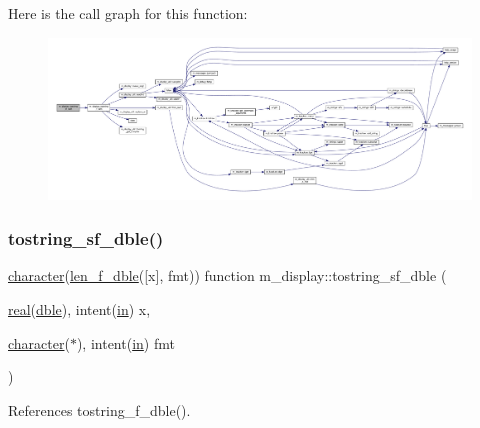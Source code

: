 Here is the call graph for this function\+:
\nopagebreak
\begin{figure}[H]
\begin{center}
\leavevmode
\includegraphics[width=350pt]{namespacem__display_a2a7022ce15edf03ceccb423e9da40c87_cgraph}
\end{center}
\end{figure}
\mbox{\label{namespacem__display_a41a473fe1569b4f3b44cc3f9b1f5b1ce}} 
\subsubsection{\texorpdfstring{tostring\+\_\+sf\+\_\+dble()}{tostring\_sf\_dble()}}
{\footnotesize\ttfamily \hyperlink{option__stopwatch_83_8txt_abd4b21fbbd175834027b5224bfe97e66}{character}(\hyperlink{namespacem__display_aa013a639d5b0f7e40b627c9d712693f0}{len\+\_\+f\+\_\+dble}(\mbox{[}x\mbox{]}, fmt)) function m\+\_\+display\+::tostring\+\_\+sf\+\_\+dble (\begin{DoxyParamCaption}\item[{\hyperlink{read__watch_83_8txt_abdb62bde002f38ef75f810d3a905a823}{real}(\hyperlink{namespacem__display_a46d90b75b6ccef7ccade133e5847e815}{dble}), intent(\hyperlink{M__journal_83_8txt_afce72651d1eed785a2132bee863b2f38}{in})}]{x,  }\item[{\hyperlink{option__stopwatch_83_8txt_abd4b21fbbd175834027b5224bfe97e66}{character}($\ast$), intent(\hyperlink{M__journal_83_8txt_afce72651d1eed785a2132bee863b2f38}{in})}]{fmt }\end{DoxyParamCaption})\hspace{0.3cm}{\ttfamily [private]}}



References tostring\+\_\+f\+\_\+dble().

